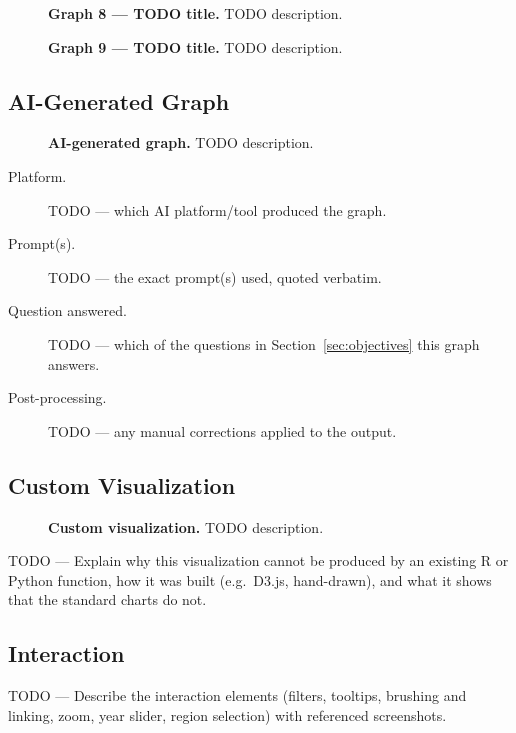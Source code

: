 \begin{figure}[H]
\centering
{}
\caption{\textbf{Graph 8 --- TODO title.} TODO description.}
\label{fig:g8}
\end{figure}

\begin{figure}[H]
\centering
{}
\caption{\textbf{Graph 9 --- TODO title.} TODO description.}
\label{fig:g9}
\end{figure}

\subsection{AI-Generated Graph}
\label{sec:aigraph}

\begin{figure}[H]
\centering
{}
\caption{\textbf{AI-generated graph.} TODO description.}
\label{fig:aigraph}
\end{figure}

\begin{description}
  \item[Platform.] TODO --- which AI platform/tool produced the graph.
  \item[Prompt(s).] TODO --- the exact prompt(s) used, quoted verbatim.
  \item[Question answered.] TODO --- which of the questions in
        Section~\ref{sec:objectives} this graph answers.
  \item[Post-processing.] TODO --- any manual corrections applied to the output.
\end{description}

\subsection{Custom Visualization}
\label{sec:customviz}

\begin{figure}[H]
\centering
{}
\caption{\textbf{Custom visualization.} TODO description.}
\label{fig:customviz}
\end{figure}

TODO --- Explain why this visualization cannot be produced by an existing
R or Python function, how it was built (e.g.\ D3.js, hand-drawn), and what
it shows that the standard charts do not.

\subsection{Interaction}
\label{sec:interaction}

TODO --- Describe the interaction elements (filters, tooltips, brushing and
linking, zoom, year slider, region selection) with referenced screenshots.
